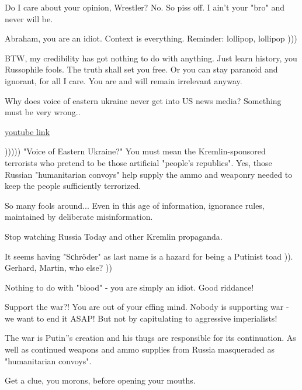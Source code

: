 \begin{itemize}
\begin{itemize}

Do I care about your opinion, Wrestler? No. So piss off. I ain't your "bro" and
never will be.


Abraham, you are an idiot. Context is everything.
Reminder: lollipop, lollipop )))


BTW, my credibility has got nothing to do with anything. Just learn history, you Russophile fools. The truth shall set you free.
Or you can stay paranoid and ignorant, for all I care. You are and will remain irrelevant anyway.


Why does voice of eastern ukraine never get into US news media? Something must
be very wrong.. 

\href{https://www.youtube.com/watch?v=7GzOaIXnkPs}{%
youtube link
}


))))) "Voice of Eastern Ukraine?" You must mean the Kremlin-sponsored
terrorists who pretend to be those artificial "people's republics". Yes, those
Russian "humanitarian convoys" help supply the ammo and weaponry needed to keep
the people sufficiently terrorized.

So many fools around... Even in this age of information, ignorance rules,
maintained by deliberate misinformation.

Stop watching Russia Today and other Kremlin propaganda.


It seems having "Sсhröder" as last name is a hazard for being a Putinist toad
)). Gerhard, Martin, who else? ))



Nothing to do with "blood" - you are simply an idiot. Good riddance!


Support the war?! You are out of your effing mind. Nobody is supporting war -
we want to end it ASAP! But not by capitulating to aggressive imperialists!

The war is Putin''s creation and his thugs are responsible for its
continuation. As well as continued weapons and ammo supplies from Russia
masqueraded as "humanitarian convoys".

Get a clue, you morons, before opening your mouths.


\end{itemize}
\end{itemize}
